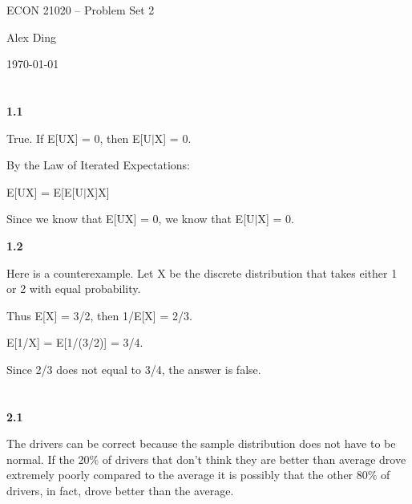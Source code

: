 



{\LARGE \centering ECON 21020 -- Problem Set 2\par}
{\vspace{-1em} \large \centering Alex Ding \par}
{\centering \vspace{-1em} \today \par }

\section{}
\textbf{1.1}

True. If E[UX] = 0, then E[U$\mid$X] = 0.

By the Law of Iterated Expectations:

E[UX] = E[E[U$\mid$X]X]

Since we know that E[UX] = 0, we know that E[U$\mid$X] = 0.

\textbf{1.2}

Here is a counterexample.
Let X be the discrete distribution that takes either 1 or 2 with equal probability.

Thus E[X] = 3/2, then 1/E[X] = 2/3.

E[1/X] = E[1/(3/2)] = 3/4.

Since 2/3 does not equal to 3/4, the answer is false.


\section{}

\textbf{2.1}

The drivers can be correct because the sample distribution does not have to be normal. If the 20$\%$ of drivers that don't think they are better than average drove extremely poorly compared to the average it is possibly that the other 80$\%$ of drivers, in fact, drove better than the average.

\section{}

